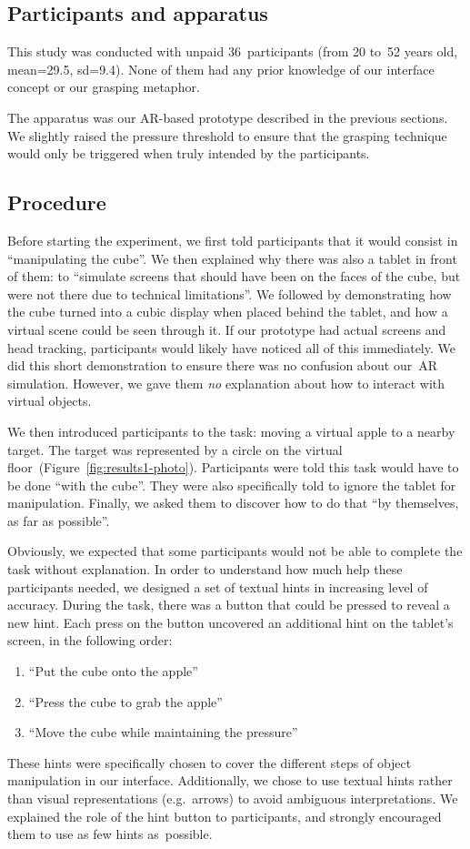 \documentclass{vgtc}                         \havecopyrightspacefalse
\begin{document}
\subsection{Participants and apparatus}

This study was conducted with unpaid 36~participants (from 20 to~52 years old, mean=29.5, sd=9.4). None of them had any prior knowledge of our interface concept or our grasping metaphor.

The apparatus was our AR-based prototype described in the previous sections. We slightly raised the pressure threshold to ensure that the grasping technique would only be triggered when truly intended by the participants.

\subsection{Procedure}

Before starting the experiment, we first told participants that it would consist in ``manipulating the cube''. We then explained why there was also a tablet in front of them: to ``simulate screens that should have been on the faces of the cube, but were not there due to technical limitations''. We followed by demonstrating how the cube turned into a cubic display when placed behind the tablet, and how a virtual scene could be seen through it. If our prototype had actual screens and head tracking, participants would likely have noticed all of this immediately. We did this short demonstration to ensure there was no confusion about our~AR simulation. However, we gave them \emph{no} explanation about how to interact with virtual objects.

We then introduced participants to the task: moving a virtual apple to a nearby target. The target was represented by a circle on the virtual floor~(Figure~\ref{fig:results1-photo}). Participants were told this task would have to be done ``with the cube''. They were also specifically told to ignore the tablet for manipulation. Finally, we asked them to discover how to do that ``by themselves, as far as possible''.

Obviously, we expected that some participants would not be able to complete the task without explanation. In order to understand how much help these participants needed, we designed a set of textual hints in increasing level of accuracy. During the task, there was a button that could be pressed to reveal a new hint. Each press on the button uncovered an additional hint on the tablet's screen, in the following order:
\begin{enumerate}[noitemsep]
\item ``Put the cube onto the apple''
\item ``Press the cube to grab the apple''
\item ``Move the cube while maintaining the pressure''
\end{enumerate}
These hints were specifically chosen to cover the different steps of object manipulation in our interface. Additionally, we chose to use textual hints rather than visual representations (e.g.~arrows) to avoid ambiguous interpretations. We explained the role of the hint button to participants, and strongly encouraged them to use as few hints as~possible.
\end{document}

